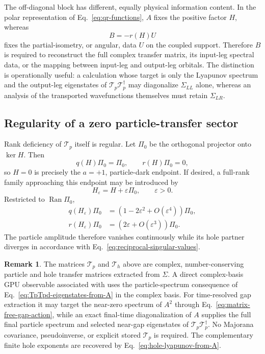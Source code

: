 \documentclass[aps,prb,onecolumn,nofootinbib,superscriptaddress]{revtex4-2}
\newcommand{\Ran}{\operatorname{Ran}}
\newcommand{\eps}{\varepsilon}
\theoremstyle{plain}
\theoremstyle{definition}
\newtheorem{remark}{Remark}
\begin{document}
The off-diagonal block has different, equally physical information content.
In the polar representation of Eq.~\eqref{eq:qr-functions}, \(A\) fixes
the positive factor \(H\), whereas
\begin{equation}
  B=-r(H)U
  \label{eq:B-carries-polar-isometry}
\end{equation}
fixes the partial-isometry, or angular, data \(U\) on the coupled support.
Therefore \(B\) is required to reconstruct the full complex transfer matrix,
its input-leg spectral data, or the mapping between input-leg and output-leg
orbitals.  The distinction is operationally useful: a calculation whose
target is only the Lyapunov spectrum and the output-leg eigenstates of
\(\mathcal T_p\mathcal T_p^\dagger\) may diagonalize \(\Sigma_{LL}\)
alone, whereas an analysis of the transported wavefunctions themselves must
retain \(\Sigma_{LR}\).

\subsection{Regularity of a zero particle-transfer sector}

Rank deficiency of \(\mathcal T_p\) itself is regular.  Let \(\Pi_0\) be the
orthogonal projector onto \(\ker H\).  Then
\begin{equation}
  q(H)\Pi_0=\Pi_0,
  \qquad
  r(H)\Pi_0=0,
  \label{eq:kernel-qr}
\end{equation}
so \(H=0\) is precisely the \(a=+1\), particle-dark endpoint.  If desired,
a full-rank family approaching this endpoint may be introduced by
\begin{equation}
  H_\eps=H+\eps\Pi_0,
  \qquad
  \eps>0.
  \label{eq:H-kernel-regulator}
\end{equation}
Restricted to \(\Ran\Pi_0\),
\begin{align}
  q(H_\eps)\Pi_0
  &=
  \left(1-2\eps^2+O(\eps^4)\right)\Pi_0,
  \label{eq:q-kernel-regulated}\\
  r(H_\eps)\Pi_0
  &=
  \left(2\eps+O(\eps^3)\right)\Pi_0.
  \label{eq:r-kernel-regulated}
\end{align}
The particle amplitude therefore vanishes continuously while its hole
partner diverges in accordance with
Eq.~\eqref{eq:reciprocal-singular-values}.

\begin{remark}
The matrices \(\mathcal T_p\) and \(\mathcal T_h\) above are complex,
number-conserving particle and hole transfer matrices extracted from
\(\Sigma\).  A direct complex-basis GPU observable associated with
uses the particle-spectrum consequence of
Eq.~\eqref{eq:TpTpd-eigenstates-from-A} in the complex basis.  For
time-resolved gap extraction it may target the near-zero spectrum of
\(A^2\) through Eq.~\eqref{eq:matrix-free-gap-action}, while an exact
final-time diagonalization of \(A\) supplies the full final particle
spectrum and selected near-gap eigenstates of
\(\mathcal T_p\mathcal T_p^\dagger\).  No Majorana covariance,
pseudoinverse, or explicit stored \(\mathcal T_p\) is required.
The complementary finite hole exponents are recovered by
Eq.~\eqref{eq:hole-lyapunov-from-A}.
\end{remark}
\end{document}
